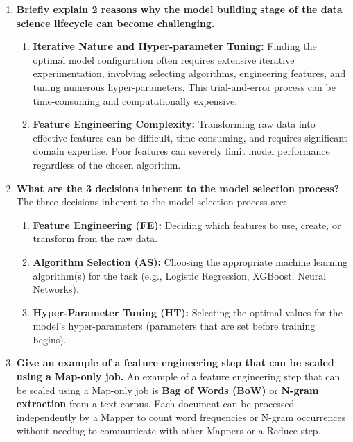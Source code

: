 \documentclass{article}
\begin{document}
\begin{enumerate}
    \item \textbf{Briefly explain 2 reasons why the model building stage of the data science lifecycle can become challenging.}
    \begin{enumerate}[label=\alph*)]
        \item \textbf{Iterative Nature and Hyper-parameter Tuning:} Finding the optimal model configuration often requires extensive iterative experimentation, involving selecting algorithms, engineering features, and tuning numerous hyper-parameters. This trial-and-error process can be time-consuming and computationally expensive.
        \item \textbf{Feature Engineering Complexity:} Transforming raw data into effective features can be difficult, time-consuming, and requires significant domain expertise. Poor features can severely limit model performance regardless of the chosen algorithm.
    \end{enumerate}

    \item \textbf{What are the 3 decisions inherent to the model selection process?}
    The three decisions inherent to the model selection process are:
    \begin{enumerate}[label=\alph*)]
        \item \textbf{Feature Engineering (FE):} Deciding which features to use, create, or transform from the raw data.
        \item \textbf{Algorithm Selection (AS):} Choosing the appropriate machine learning algorithm(s) for the task (e.g., Logistic Regression, XGBoost, Neural Networks).
        \item \textbf{Hyper-Parameter Tuning (HT):} Selecting the optimal values for the model's hyper-parameters (parameters that are set before training begins).
    \end{enumerate}

    \item \textbf{Give an example of a feature engineering step that can be scaled using a Map-only job.}
    An example of a feature engineering step that can be scaled using a Map-only job is \textbf{Bag of Words (BoW)} or \textbf{N-gram extraction} from a text corpus. Each document can be processed independently by a Mapper to count word frequencies or N-gram occurrences without needing to communicate with other Mappers or a Reduce step.


\end{enumerate}
\end{document}
